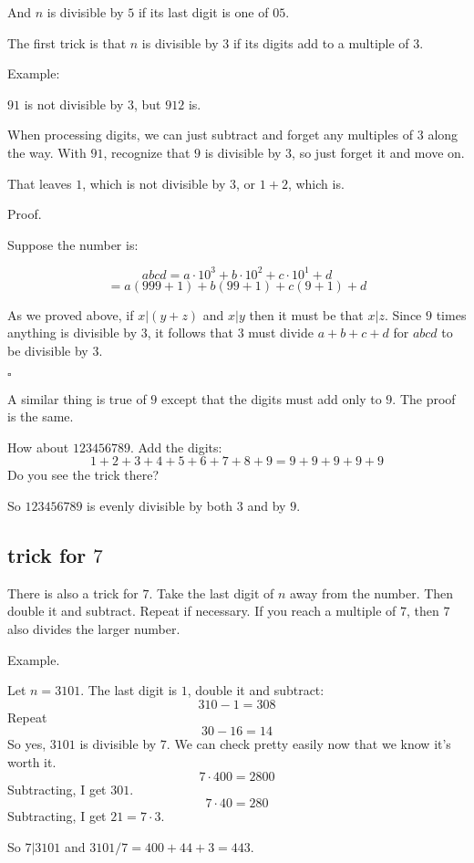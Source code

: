 \documentclass[11pt, oneside]{article}
\begin{document}
And $n$ is divisible by $5$ if its last digit is one of $05$.

The first trick is that $n$ is divisible by $3$ if its digits add to a multiple of $3$.

Example:

$91$ is not divisible by $3$, but $912$ is.  

When processing digits, we can just subtract and forget any multiples of $3$ along the way.  With $91$, recognize that $9$ is divisible by $3$, so just forget it and move on.  

That leaves $1$, which is not divisible by $3$, or $1 + 2$, which is.

Proof.

Suppose the number is:

\[ abcd = a \cdot 10^3 + b \cdot 10^2 + c \cdot 10^1 + d \]
\[ = a (999 + 1) + b (99 + 1) + c (9 + 1) + d \]

As we proved above, if $x|(y+z)$ and $x|y$ then it must be that $x|z$.  Since $9$ times anything is divisible by $3$, it follows that $3$ must divide $a + b + c + d$ for $abcd$ to be divisible by $3$.

$\square$

A similar thing is true of $9$ except that the digits must add only to $9$.  The proof is the same.

How about $123456789$.  Add the digits:
\[ 1 + 2 + 3 + 4 + 5 + 6 + 7 + 8 + 9 = 9 + 9 + 9 + 9 + 9 \]
Do you see the trick there?

So $123456789$ is evenly divisible by both $3$ and by $9$.

\subsection*{trick for $7$}

There is also a trick for $7$.  Take the last digit of $n$ away from the number.  Then double it and subtract.  Repeat if necessary.  If you reach a multiple of $7$, then $7$ also divides the larger number.

Example.

Let $n = 3101$.  The last digit is $1$, double it and subtract:
\[ 310 - 1 = 308 \]
Repeat
\[ 30 - 16 = 14 \]
So yes, $3101$ is divisible by $7$.  We can check pretty easily now that we know it's worth it.
\[ 7 \cdot 400 = 2800 \]
Subtracting, I get $301$.
\[ 7 \cdot 40 = 280 \]
Subtracting, I get $21 = 7 \cdot 3$.  

So $7|3101$ and $3101/7 = 400 + 44 + 3 = 443$.
\end{document}
